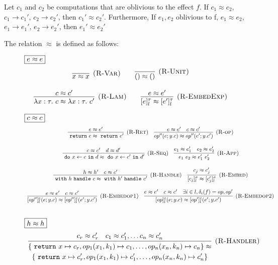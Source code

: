 \begin{theorem} 

Let $c_1$ and $c_2$ be computations that are oblivious to the effect $f$.  If $c_1 \approx c_2$, $c_1 \rightarrow c_1'$, $c_2 \rightarrow c_2'$, then $c_1' \approx c_2'$. Furthermore,  If $e_1, e_2$ oblivious to f, $e_1 \approx e_2$, $e_1 \rightarrow e_1'$, $e_2 \rightarrow e_2'$, then $e_1' \approx e_2'$

The relation $\approx$ is defined as follows:
\begin{figure}[H]
\flushleft
\footnotesize{

$\fbox{$e \approx e$}$
\[
\begin{array}{c}
\infer[\textsc{(R-Var)}]{x \approx x}
{} \qquad \infer[\textsc{(R-Unit)}]{() \approx ()}{} \\[3ex]
\infer[\textsc{(R-Lam)}]{\lambda x:\tau.\ c \approx \lambda x:\tau.\ c'}{c \approx c'} \qquad
\infer[\textsc{(R-EmbedExp)}]{[e]^\tau_l \approx [e']^\tau_l}{e \approx e'}
\end{array}
\]


$\fbox{$c \approx c$}$
\[
\begin{array}{c}
\infer[\textsc{(R-Ret)}]
  {\m{return} e \approx \m{return} e'}
  {e \approx e'}  
  \quad 
\infer[\textsc{(R-op)}]
  {op''(e; y.c) \approx op''(e'; y.c')}
  {e \approx e' & c \approx c'}
  \\[3ex]
\infer[\textsc{(R-Seq)}]
  {\m{do} x \leftarrow c \m{in} d \approx \m{do} x \leftarrow c' \m{in} d'}
  {c \approx c' & d  \approx d'} \quad
\infer[\textsc{(R-App)}]
  {e_1\ e_2 \approx e_1'\ e_2'}
  {e_1 \approx e_1' & e_2 \approx e_2'} \\[3ex]
\infer[\textsc{(R-Handle)}]
  {\m{with} h \m{handle} c \approx \m{with} h' \m{handle} c'}
  {h \approx h' & c \approx c'} \quad 
\infer[\textsc{(R-Embed)}]
  {[c_j]^\sigma_l \approx [c_j']^\sigma_l}
  {c_j \approx c_j'} \\[3ex]

\infer[\textsc{(R-Embedop1)}]
  {[op'']^\varepsilon_l(e; y.c) \approx [op'']^\varepsilon_l(e'; y.c')}
  {e \approx e' & c \approx c'}
  \quad
\infer[\textsc{(R-Embedop2)}]
  {[op]^\varepsilon_l(e; y.c) \approx [op']^\varepsilon_l(e'; y.c')}
  {e \approx e' & c \approx c' & \exists i \in l, \delta_i(f) = op, op'} \\[3ex]
\end{array}
\]

$\fbox{$h \approx h$}$
\[
\begin{array}{c}
\infer[\textsc{(R-Handler)}]{\begin{gathered} \{\m{return} x \mapsto c_r, op_1(x_1, k_1) \mapsto c_1, \dots, op_n(x_n, k_n) \mapsto c_n\} \approx \\\{\m{return} x \mapsto c_r', op_1(x_1, k_1) \mapsto c_1', \dots, op_n(x_n, k_n) \mapsto c_n'\}  
 \end{gathered} }{ c_r \approx c_r' & c_1 \approx c_1', \dots c_n \approx c_n'} 
\end{array}
\]


}
\end{figure}
\end{theorem}
